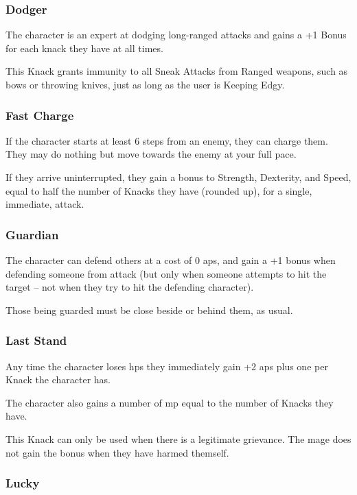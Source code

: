 \begin{multicols}{2}
\subsubsection{Dodger}
\label{dodger}

The character is an expert at dodging long-ranged attacks and gains a +1 Bonus for each knack they have at all times.

This Knack grants immunity to all Sneak Attacks from Ranged weapons, such as bows or throwing knives, just as long as the user is Keeping Edgy.

\subsubsection{Fast Charge}

If the character starts at least 6 steps from an enemy, they can charge them.
They may do nothing but move towards the enemy at your full pace.

If they arrive uninterrupted, they gain a bonus to Strength, Dexterity, and Speed, equal to half the number of Knacks they have (rounded up), for a single, immediate, attack.

\subsubsection{Guardian}

The character can defend others at a cost of 0 \glspl{ap}, and gain a +1 bonus when defending someone from attack (but only when someone attempts to hit the target -- not when they try to hit the defending character).

Those being guarded must be close beside or behind them, as usual.

\subsubsection{Last Stand}

Any time the character loses \glspl{hp} they immediately gain +2 \glspl{ap} plus one per Knack the character has.

The character also gains a number of \gls{mp} equal to the number of Knacks they have.

This Knack can only be used when there is a legitimate grievance.
The mage does not gain the bonus when they have harmed themself.

\subsubsection{Lucky}


\end{multicols}
